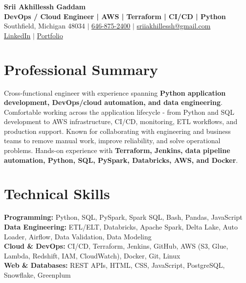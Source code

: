 \documentclass[letterpaper,10pt]{article}
\begin{document}
\fontsize{9.35pt}{10.45pt}\selectfont

\begin{center}
    {\LARGE \textbf{Srii Akhillessh Gaddam}} \\[-1pt]
    \textbf{DevOps / Cloud Engineer | AWS | Terraform | CI/CD | Python} \\[2pt]
    Southfield, Michigan 48034 $|$
    \href{tel:6468752400}{646-875-2400} $|$
    \href{mailto:sriiakhillessh@gmail.com}{sriiakhillessh@gmail.com} \\[1pt]
    \href{https://www.linkedin.com/in/srii-akhiilessh-gaddam-b48668191/}{LinkedIn} $|$
    \href{https://sriiakhillesshg.github.io/portfolio/}{Portfolio}
\end{center}
\vspace{-8pt}

\section{Professional Summary}
\small{Cross-functional engineer with experience spanning \textbf{Python application development, DevOps/cloud automation, and data engineering}. Comfortable working across the application lifecycle - from Python and SQL development to AWS infrastructure, CI/CD, monitoring, ETL workflows, and production support. Known for collaborating with engineering and business teams to remove manual work, improve reliability, and solve operational problems. Hands-on experience with \textbf{Terraform, Jenkins, data pipeline automation, Python, SQL, PySpark, Databricks, AWS, and Docker}.}

\section{Technical Skills}
\small{
\textbf{Programming:} Python, SQL, PySpark, Spark SQL, Bash, Pandas, JavaScript \\
\textbf{Data Engineering:} ETL/ELT, Databricks, Apache Spark, Delta Lake, Auto Loader, Airflow, Data Validation, Data Modeling \\
\textbf{Cloud \& DevOps:} CI/CD, Terraform, Jenkins, GitHub, AWS (S3, Glue, Lambda, Redshift, IAM, CloudWatch), Docker, Git, Linux \\
\textbf{Web \& Databases:} REST APIs, HTML, CSS, JavaScript, PostgreSQL, Snowflake, Greenplum
}
\end{document}
